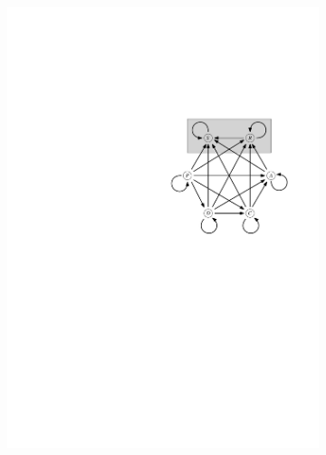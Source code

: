\documentclass[varwidth, border=0pt]{standalone}
\begin{document}
\begin{figure}
\begin{subfigure}{0.5\textwidth}
        \includegraphics[width=\textwidth]{../../graphics/legal-system-relationships.pdf}
    \end{subfigure}
    \end{figure}
	
\end{document}
